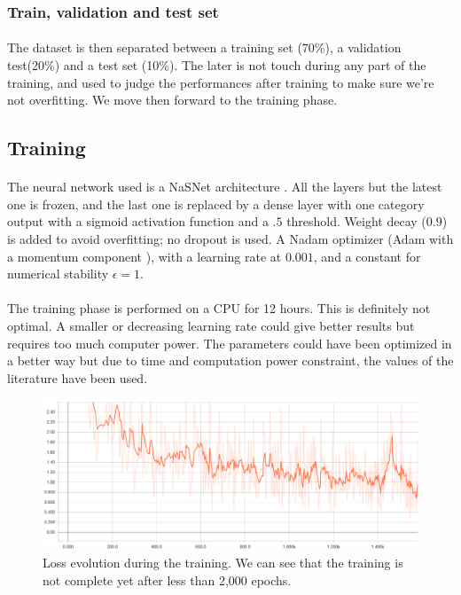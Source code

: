 \documentclass[12pt]{article}%
\begin{document}
\subsubsection{Train, validation and test set}

\paragraph{}
The dataset is then separated between a training set (70\%), a validation test(20\%) and a test set (10\%). The later is not touch during any part of the training, and used to judge the performances after training to make sure we're not overfitting. We move then forward to the training phase.

\subsection{Training}

\paragraph{}
The neural network used is a NaSNet architecture \cite{nasnet}. All the layers but the latest one is frozen, and the last one is replaced by a dense layer with one category output with a sigmoid activation function and a $.5$ threshold. Weight decay ($0.9$) is added to avoid overfitting; no dropout is used. A Nadam optimizer (Adam with a momentum component \cite{nadam}), with a learning rate at $0.001$, and a constant for numerical stability $\epsilon = 1$.

\paragraph{}
The training phase is performed on a CPU for 12 hours. This is definitely not optimal. A smaller or decreasing learning rate could give better results but requires too much computer power. The parameters could have been optimized in a better way but due to time and computation power constraint, the values of the literature have been used.

\begin{figure}
\centering
\includegraphics[width=15cm]{images/lossCurve.PNG}
\caption{\label{fig:loss}Loss evolution during the training. We can see that the training is not complete yet after less than 2,000 epochs.}
\end{figure}
\end{document}
